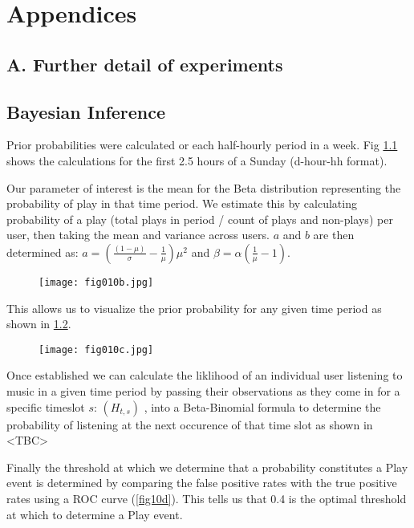 
\chapter{Appendices}

\section{A. Further detail of experiments}

\section{Bayesian Inference}

Prior probabilities were calculated or each half-hourly period in a week. Fig \ref{fig10b} shows the calculations for the first 2.5 hours of a Sunday (d-hour-hh format). 

Our parameter of interest is the mean for the Beta distribution representing the probability of play in that time period. We estimate this by calculating probability of a play (total plays in period / count of plays and non-plays) per user, then taking the mean and variance across users. $a$ and $b$ are then determined as:
$a = (\frac{(1- \mu)}{\sigma} - \frac{1}{\mu}) \mu^2$
and
$\beta=\alpha\left(\frac{1}{\mu}-1\right)$.

\begin{figure}[h!]
	\centering
	\texttt{[image: fig010b.jpg]}
	\caption{}
	\label{fig10b}
\end{figure} 

This allows us to visualize the prior probability for any given time period as shown in \ref{fig10c}.

\begin{figure}[h!]
	\centering
	\texttt{[image: fig010c.jpg]}
	\caption{}
	\label{fig10c}
\end{figure} 

Once established we can calculate the liklihood of an individual user listening to music in a given time period by passing their observations as they come in for a specific timeslot $s$: $(H_{t,s})$ , into a Beta-Binomial formula to determine the probability of listening at the next occurence of that time slot as shown in <TBC>

Finally the threshold at which we determine that a probability constitutes a Play event is determined by comparing the false positive rates with the true positive rates using a ROC curve (\ref{fig10d}). This tells us that 0.4 is the optimal threshold at which to determine a Play event.

